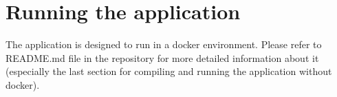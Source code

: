 \section{Running the application}
The application is designed to run in a docker environment.
Please refer to README.md file in the repository for more detailed information about it (especially the last section for compiling and running the application without docker).